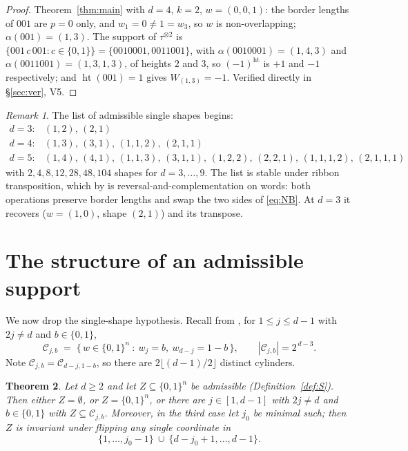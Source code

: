\documentclass[11pt]{article}
\newtheorem{theorem}{Theorem}[section]
\theoremstyle{definition}
\theoremstyle{remark}
\newtheorem{remark}[theorem]{Remark}
\newcommand{\hgt}{\operatorname{ht}}
\newcommand{\Cset}{\mathcal{C}}
\newcommand{\cube}{\{0,1\}}
\begin{document}
\begin{proof}
Theorem~\ref{thm:main} with $d=4$, $k=2$, $w=(0,0,1)$: the border lengths of $001$ are $p=0$
only, and $w_1=0\ne1=w_3$, so $w$ is non-overlapping; $\alpha(001)=(1,3)$.  The support of
$\tau^{\otimes2}$ is $\{001\,c\,001:c\in\cube\}=\{0010001,0011001\}$, with
$\alpha(0010001)=(1,4,3)$ and $\alpha(0011001)=(1,3,1,3)$, of heights $2$ and $3$, so
$(-1)^{\hgt}$ is $+1$ and $-1$ respectively; and $\hgt(001)=1$ gives $W_{(1,3)}=-1$.  Verified directly in \S\ref{sec:ver}, V5.
\end{proof}

\begin{remark}
The list of admissible single shapes begins:
\[
\begin{array}{ll}
 d=3: & (1,2),\,(2,1)\\
 d=4: & (1,3),\,(3,1),\,(1,1,2),\,(2,1,1)\\
 d=5: & (1,4),\,(4,1),\,(1,1,3),\,(3,1,1),\,(1,2,2),\,(2,2,1),\,(1,1,1,2),\,(2,1,1,1)
\end{array}
\]
with $2,4,8,12,28,48,104$ shapes for $d=3,\dots,9$.  The list is stable under ribbon
transposition, which by \cite[Lemma 1.6]{Q149} is reversal-and-complementation on words: both
operations preserve border lengths and swap the two sides of \eqref{eq:NB}.  At $d=3$ it
recovers \cite[Thm.~6.7]{Q150c1} ($w=(1,0)$, shape $(2,1)$) and its transpose.
\end{remark}

\section{The structure of an admissible support}\label{sec:struct}

We now drop the single-shape hypothesis.  Recall from \cite[Conv.~6.4]{Q150c1}, for
$1\le j\le d-1$ with $2j\ne d$ and $b\in\cube$,
\[
   \Cset_{j,b}\;=\;\bigl\{\,w\in\cube^{n}\ :\ w_j=b,\ w_{d-j}=1-b\,\bigr\},
   \qquad |\Cset_{j,b}|=2^{\,d-3}.
\]
Note $\Cset_{j,b}=\Cset_{d-j,1-b}$, so there are $2\lfloor(d-1)/2\rfloor$ distinct cylinders.

\begin{theorem}\label{thm:struct}
Let $d\ge2$ and let $Z\subseteq\cube^{n}$ be admissible (Definition~\ref{def:S}).  Then either
$Z=\emptyset$, or $Z=\cube^{n}$, or there are $j\in[1,d-1]$ with $2j\ne d$ and $b\in\cube$ with
$Z\subseteq\Cset_{j,b}$.  Moreover, in the third case let $j_0$ be minimal such; then $Z$ is
invariant under flipping any single coordinate in
\[
   \{1,\dots,j_0-1\}\ \cup\ \{d-j_0+1,\dots,d-1\}.
\]
\end{theorem}
\end{document}
